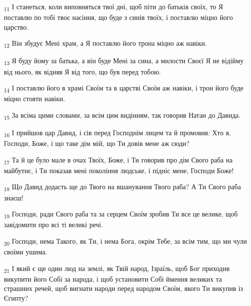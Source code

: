 \begin{tcolorbox}
\textsubscript{11} І станеться, коли виповняться твої дні, щоб піти до батьків своїх, то Я поставлю по тобі твоє насіння, що буде з синів твоїх, і поставлю міцно його царство.
\end{tcolorbox}
\begin{tcolorbox}
\textsubscript{12} Він збудує Мені храм, а Я поставлю його трона міцно аж навіки.
\end{tcolorbox}
\begin{tcolorbox}
\textsubscript{13} Я буду йому за батька, а він буде Мені за сина, а милости Своєї Я не відійму від нього, як відняв Я від того, що був перед тобою.
\end{tcolorbox}
\begin{tcolorbox}
\textsubscript{14} І поставлю його в храмі Своїм та в царстві Своїм аж навіки, і трон його буде міцно стояти навіки.
\end{tcolorbox}
\begin{tcolorbox}
\textsubscript{15} За всіма цими словами, за всім цим видінням, так говорив Натан до Давида.
\end{tcolorbox}
\begin{tcolorbox}
\textsubscript{16} І прийшов цар Давид, і сів перед Господнім лицем та й промовив: Хто я, Господи, Боже, і що таке дім мій, що Ти довів мене аж сюди?
\end{tcolorbox}
\begin{tcolorbox}
\textsubscript{17} Та й це було мале в очах Твоїх, Боже, і Ти говорив про дім Свого раба на майбутнє, і Ти показав мені покоління людське, і підніс мене, Господи Боже!
\end{tcolorbox}
\begin{tcolorbox}
\textsubscript{18} Що Давид додасть ще до Твого на вшанування Твого раба? А Ти Свого раба знаєш!
\end{tcolorbox}
\begin{tcolorbox}
\textsubscript{19} Господи, ради Свого раба та за серцем Своїм зробив Ти все це велике, щоб завідомити про всі ті великі речі.
\end{tcolorbox}
\begin{tcolorbox}
\textsubscript{20} Господи, нема Такого, як Ти, і нема Бога, окрім Тебе, за всім тим, що ми чули своїми ушима.
\end{tcolorbox}
\begin{tcolorbox}
\textsubscript{21} І який є ще один люд на землі, як Твій народ, Ізраїль, щоб Бог приходив викупити його Собі за народа, і щоб установити Собі ймення великих та страшних речей, щоб вигнати народи перед народом Своїм, якого Ти викупив із Єгипту?
\end{tcolorbox}
